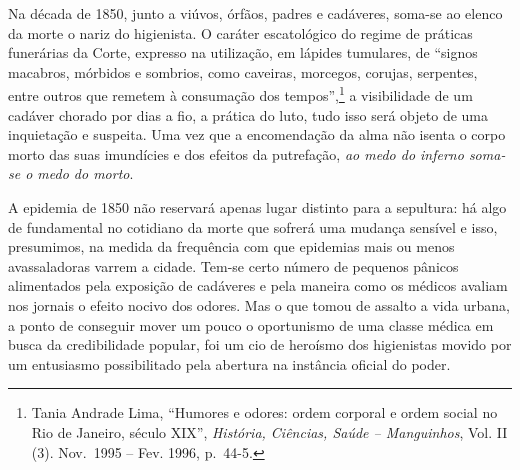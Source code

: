 Na década de 1850, junto a viúvos, órfãos, padres e cadáveres, soma-se
ao elenco da morte o nariz do higienista. O caráter escatológico do
regime de práticas funerárias da Corte, expresso na utilização, em
lápides tumulares, de ``signos macabros, mórbidos e sombrios, como
caveiras, morcegos, corujas, serpentes, entre outros que remetem à
consumação dos tempos'',\footnote{Tania Andrade Lima, ``Humores e
  odores: ordem corporal e ordem social no Rio de Janeiro, século XIX'',
  \emph{História, Ciências, Saúde -- Manguinhos}, Vol. II (3). Nov.~1995
  -- Fev. 1996, p.~44-5.} a visibilidade de um cadáver chorado por dias
a fio, a prática do luto, tudo isso será objeto de uma inquietação e
suspeita. Uma vez que a encomendação da alma não isenta o corpo morto
das suas imundícies e dos efeitos da putrefação, \emph{ao medo do
inferno soma-se o medo do morto}.

A epidemia de 1850 não reservará apenas lugar distinto para a sepultura:
há algo de fundamental no cotidiano da morte que sofrerá uma mudança
sensível e isso, presumimos, na medida da frequência com que epidemias
mais ou menos avassaladoras varrem a cidade. Tem-se certo número de
pequenos pânicos alimentados pela exposição de cadáveres e pela maneira
como os médicos avaliam nos jornais o efeito nocivo dos odores. Mas o
que tomou de assalto a vida urbana, a ponto de conseguir mover um pouco
o oportunismo de uma classe médica em busca da credibilidade popular,
foi um cio de heroísmo dos higienistas movido por um entusiasmo
possibilitado pela abertura na instância oficial do poder.

